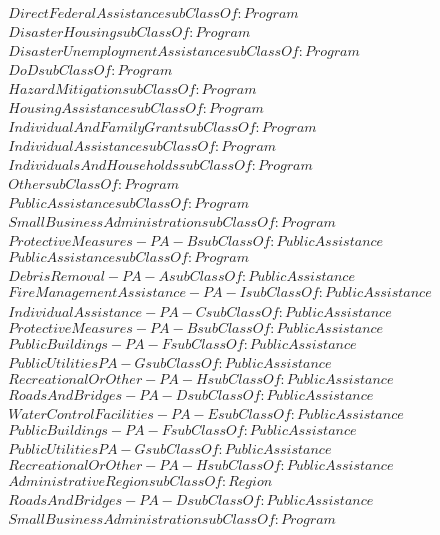 \begin{align}
  DirectFederalAssistance subClassOf: Program\\
  DisasterHousing subClassOf: Program\\
  DisasterUnemploymentAssistance subClassOf: Program\\
  DoD subClassOf: Program\\
  HazardMitigation subClassOf: Program\\
  HousingAssistance subClassOf: Program\\
  IndividualAndFamilyGrant subClassOf: Program\\
  IndividualAssistance subClassOf: Program\\
  IndividualsAndHouseholds subClassOf: Program\\
  Other subClassOf: Program\\
  PublicAssistance subClassOf: Program\\
  SmallBusinessAdministration subClassOf: Program\\
  ProtectiveMeasures-PA-B subClassOf: PublicAssistance\\
  PublicAssistance subClassOf: Program\\
  DebrisRemoval-PA-A subClassOf: PublicAssistance\\
  FireManagementAssistance-PA-I subClassOf: PublicAssistance\\
  IndividualAssistance-PA-C subClassOf: PublicAssistance\\
  ProtectiveMeasures-PA-B subClassOf: PublicAssistance\\
  PublicBuildings-PA-F subClassOf: PublicAssistance\\
  PublicUtilitiesPA-G subClassOf: PublicAssistance\\
  RecreationalOrOther-PA-H subClassOf: PublicAssistance\\
  RoadsAndBridges-PA-D subClassOf: PublicAssistance\\
  WaterControlFacilities-PA-E subClassOf: PublicAssistance\\
  PublicBuildings-PA-F subClassOf: PublicAssistance\\
  PublicUtilitiesPA-G subClassOf: PublicAssistance\\
  RecreationalOrOther-PA-H subClassOf: PublicAssistance\\
  AdministrativeRegion subClassOf: Region\\
  RoadsAndBridges-PA-D subClassOf: PublicAssistance\\
  SmallBusinessAdministration subClassOf: Program\\

\end{align}
